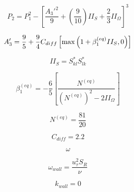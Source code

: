 {\newpage\clearpage
{}%
\begin{displaymath}
P_2 = P_1^2 - \left[ \frac{A_3'^2}{9} + \left( \frac{9}{10} \right) II_{S} + \frac{2}{3} II_{\Omega} \right]^3
\end{displaymath}%
\lthtmldisplayZ
\lthtmlcheckvsize\clearpage}

{\newpage\clearpage
{}%
\begin{displaymath}
A_3' = \frac{9}{5} + \frac{9}{4} C_{diff} \left[ {\rm max} \left( 1 + \beta_1^{(eq)} II_S, 0 \right) \right]
\end{displaymath}%
\lthtmldisplayZ
\lthtmlcheckvsize\clearpage}

{\newpage\clearpage
{}%
\begin{displaymath}
II_{S} = S_{kl}^*S_{lk}^*
\end{displaymath}%
\lthtmldisplayZ
\lthtmlcheckvsize\clearpage}

{\newpage\clearpage
{}%
\begin{displaymath}
\beta_1^{(eq)} = - \frac{6}{5} \left[ \frac{N^{(eq)}}{\left(N^{(eq)}\right)^2 - 2 II_{\Omega}} \right]
\end{displaymath}%
\lthtmldisplayZ
\lthtmlcheckvsize\clearpage}

{\newpage\clearpage
{}%
\begin{displaymath}
N^{(eq)} = \frac{81}{20}
\end{displaymath}%
\lthtmldisplayZ
\lthtmlcheckvsize\clearpage}

{\newpage\clearpage
{}%
\begin{displaymath}
C_{diff} = 2.2
\end{displaymath}%
\lthtmldisplayZ
\lthtmlcheckvsize\clearpage}

{\newpage\clearpage
{}%
\begin{displaymath}
\omega
\end{displaymath}%
\lthtmldisplayZ
\lthtmlcheckvsize\clearpage}

{\newpage\clearpage
{}%
\begin{displaymath}
\omega_{wall} = \frac{u_{\tau}^2 S_R}{\nu}
\end{displaymath}%
\lthtmldisplayZ
\lthtmlcheckvsize\clearpage}

{\newpage\clearpage
{}%
\begin{displaymath}
k_{wall} = 0
\end{displaymath}%
\lthtmldisplayZ
\lthtmlcheckvsize\clearpage}

